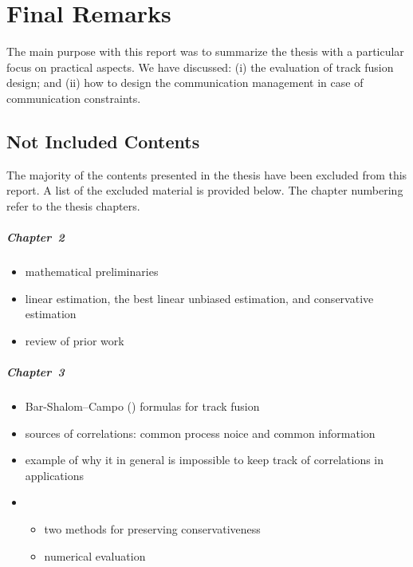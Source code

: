 

\chapter{Final Remarks} \label{cha:final-remarks}

The main purpose with this report was to summarize the thesis \cite{Forsling2023Phd} with a particular focus on practical aspects. We have discussed: (i) the evaluation of track fusion design; and (ii) how to design the communication management in case of communication constraints. 


\section*{Not Included Contents}

The majority of the contents presented in the thesis have been excluded from this report. A list of the excluded material is provided below. The chapter numbering refer to the thesis chapters.

\paragraph{Chapter~2}
\begin{itemize}
	\item mathematical preliminaries
	\item linear estimation, the best linear unbiased estimation, and conservative estimation
	\item review of prior work
\end{itemize}

\paragraph{Chapter~3}
\begin{itemize}
	\item Bar-Shalom--Campo (\abbrBSC) formulas for track fusion
	\item sources of correlations: common process noice and common information
	\item example of why it in general is impossible to keep track of correlations in \abbrDTT applications
	\item \abbrDCA
	\begin{itemize}
		\item two methods for preserving conservativeness
		\item numerical evaluation
	\end{itemize}
\end{itemize}

